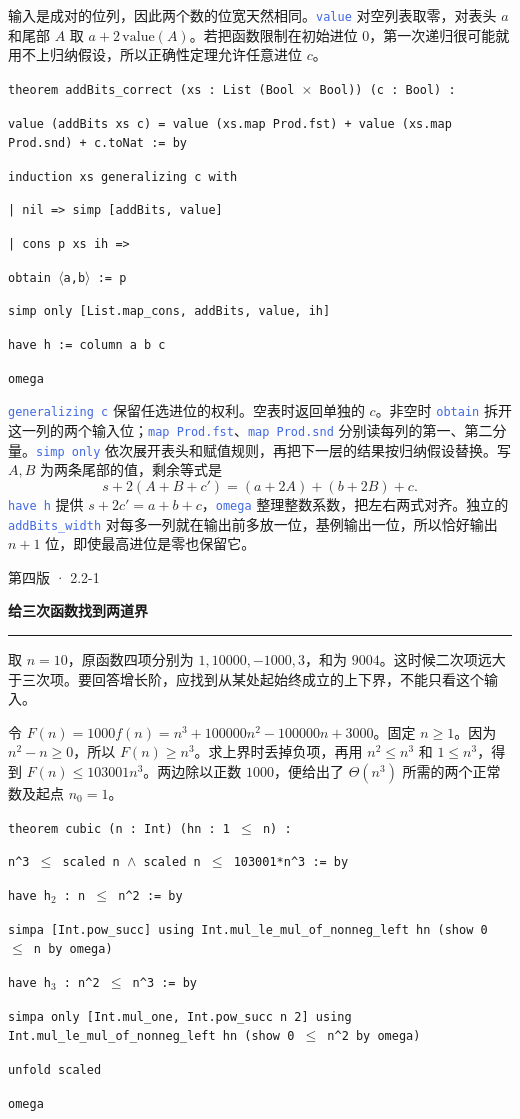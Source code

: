 \documentclass[UTF8,11pt,a4paper,fontset=fandol]{ctexart}
\newcommand{\HandoutLesson}[2]{%
  \par{\small\heiti\color{BrickRed}#1}\par\vspace{3pt}
  {\fontsize{21}{27}\selectfont\heiti\bfseries #2}\par
  \textcolor{BrickRed}{\rule{\linewidth}{.7pt}}\par}
\newcommand{\src}[1]{\textcolor{RoyalBlue}{\texttt{#1}}}
\newcommand{\subhead}[1]{\par\vspace{3pt}{\heiti\bfseries\color{RoyalBlue}#1}\par}
\newenvironment{leanblock}{\par\smallskip\noindent\begin{lrbox}{\leanbox}\begin{minipage}{\dimexpr\linewidth-12pt\relax}\raggedright\small\setlength{\parskip}{0pt}}{\end{minipage}\end{lrbox}\colorbox{RoyalBlue!6}{\usebox{\leanbox}}\par\smallskip}
\newcommand{\lineofcode}[2]{\noindent\hspace*{#1em}\strut\texttt{#2}\par}
\begin{document}
输入是成对的位列，因此两个数的位宽天然相同。\src{value} 对空列表取零，对表头 $a$ 和尾部 $A$ 取 $a+2\,\mathrm{value}(A)$。若把函数限制在初始进位 $0$，第一次递归很可能就用不上归纳假设，所以正确性定理允许任意进位 $c$。
\begin{leanblock}
\lineofcode{0.0}{theorem addBits\_correct (xs : List (Bool \ensuremath{\times} Bool)) (c : Bool) :}
\lineofcode{1.8}{value (addBits xs c) = value (xs.map Prod.fst) + value (xs.map Prod.snd) + c.toNat := by}
\lineofcode{0.9}{induction xs generalizing c with}
\lineofcode{0.9}{| nil => simp [addBits, value]}
\lineofcode{0.9}{| cons p xs ih =>}
\lineofcode{1.8}{obtain \ensuremath{\langle}a,b\ensuremath{\rangle} := p}
\lineofcode{1.8}{simp only [List.map\_cons, addBits, value, ih]}
\lineofcode{1.8}{have h := column a b c}
\lineofcode{1.8}{omega}
\end{leanblock}
\src{generalizing c} 保留任选进位的权利。空表时返回单独的 $c$。非空时 \src{obtain} 拆开这一列的两个输入位；\src{map Prod.fst}、\src{map Prod.snd} 分别读每列的第一、第二分量。\src{simp only} 依次展开表头和赋值规则，再把下一层的结果按归纳假设替换。写 $A,B$ 为两条尾部的值，剩余等式是
\[
 s+2(A+B+c')=(a+2A)+(b+2B)+c .
\]
\src{have h} 提供 $s+2c'=a+b+c$，\src{omega} 整理整数系数，把左右两式对齐。独立的 \src{addBits\_width} 对每多一列就在输出前多放一位，基例输出一位，所以恰好输出 $n+1$ 位，即使最高进位是零也保留它。
\par{}
\clearpage{}\label{p25}\HandoutLesson{第四版 · 2.2-1}{给三次函数找到两道界}
取 $n=10$，原函数四项分别为 $1,10000,-1000,3$，和为 $9004$。这时候二次项远大于三次项。要回答增长阶，应找到从某处起始终成立的上下界，不能只看这个输入。
\subhead{把分母先移走}
令 $F(n)=1000 f(n)=n^3+100000n^2-100000n+3000$。固定 $n\ge1$。因为 $n^2-n\ge0$，所以 $F(n)\ge n^3$。求上界时丢掉负项，再用 $n^2\le n^3$ 和 $1\le n^3$，得到 $F(n)\le103001n^3$。两边除以正数 $1000$，便给出了 $\Theta(n^3)$ 所需的两个正常数及起点 $n_0=1$。
\begin{leanblock}
\lineofcode{0.0}{theorem cubic (n : Int) (hn : 1 \ensuremath{\leq} n) :}
\lineofcode{1.8}{n\textasciicircum{}3 \ensuremath{\leq} scaled n \ensuremath{\wedge} scaled n \ensuremath{\leq} 103001*n\textasciicircum{}3 := by}
\lineofcode{0.9}{have h\ensuremath{{}_{2}} : n \ensuremath{\leq} n\textasciicircum{}2 := by}
\lineofcode{1.8}{simpa [Int.pow\_succ] using Int.mul\_le\_mul\_of\_nonneg\_left hn (show 0 \ensuremath{\leq} n by omega)}
\lineofcode{0.9}{have h\ensuremath{{}_{3}} : n\textasciicircum{}2 \ensuremath{\leq} n\textasciicircum{}3 := by}
\lineofcode{1.8}{simpa only [Int.mul\_one, Int.pow\_succ n 2] using Int.mul\_le\_mul\_of\_nonneg\_left hn (show 0 \ensuremath{\leq} n\textasciicircum{}2 by omega)}
\lineofcode{0.9}{unfold scaled}
\lineofcode{0.9}{omega}
\end{leanblock}
\end{document}
